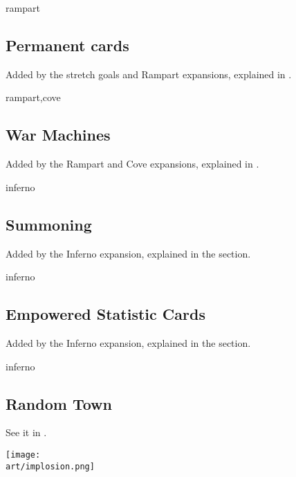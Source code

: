 
\begin{multicols*}{2}


\begin{expansion}{rampart}
\subsection*{Permanent cards}
Added by the stretch goals and Rampart expansions, explained in .
\end{expansion}

\vspace*{1em}
\begin{expansion}{rampart,cove}
\subsection*{War Machines}
Added by the Rampart and Cove expansions, explained in .
\end{expansion}

\vspace*{1em}
\begin{expansion}{inferno}
\subsection*{Summoning}
  Added by the Inferno expansion, explained in the  section.
\end{expansion}

\vspace*{1em}
\begin{expansion}{inferno}
  \subsection*{Empowered Statistic Cards}
  Added by the Inferno expansion, explained in the  section.
\end{expansion}

\vspace*{1em}
\begin{expansion}{inferno}
  \subsection*{Random Town}
  See it in .
\end{expansion}
\vspace*{\fill}
\hspace{-3em}
{\texttt{[image: \\art/implosion.png]}}
\columnbreak


\end{multicols*}
